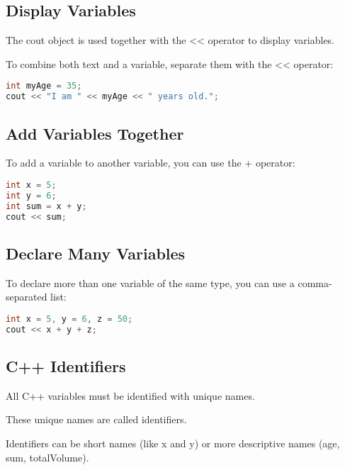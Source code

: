 \documentclass[12pt]{book}
\begin{document}
\subsection{Display Variables}

The cout object is used together with the << operator to display variables.

To combine both text and a variable, separate them with the << operator:


\lstset{style=mystyle}
\begin{lstlisting}[language=C++, caption=C++ example]
int myAge = 35;
cout << "I am " << myAge << " years old.";
\end{lstlisting}



\subsection{Add Variables Together}

To add a variable to another variable, you can use the + operator:


\lstset{style=mystyle}
\begin{lstlisting}[language=C++, caption=C++ example]
int x = 5;
int y = 6;
int sum = x + y;
cout << sum;
\end{lstlisting}




\subsection{Declare Many Variables}

To declare more than one variable of the same type, you can use a comma-separated list:


\lstset{style=mystyle}
\begin{lstlisting}[language=C++, caption=C++ example]
int x = 5, y = 6, z = 50;
cout << x + y + z;
\end{lstlisting}



\subsection{C++ Identifiers}

All C++ variables must be identified with unique names.

These unique names are called identifiers.

Identifiers can be short names (like x and y) or more descriptive names (age, sum, totalVolume).
\end{document}
